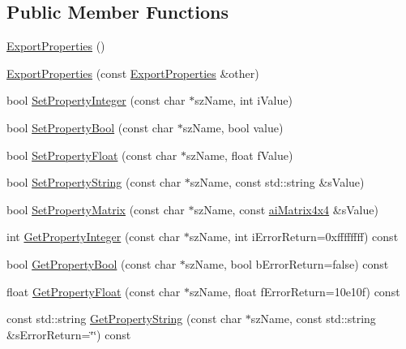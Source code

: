 \subsection*{Public Member Functions}
\begin{DoxyCompactItemize}
\item 
\hyperlink{class_assimp_1_1_export_properties_aedefab9bf14c50bcd319eda39030aa0e}{Export\-Properties} ()
\item 
\hyperlink{class_assimp_1_1_export_properties_a5c91357f3ca4dcf7f7582abdb551534d}{Export\-Properties} (const \hyperlink{class_assimp_1_1_export_properties}{Export\-Properties} \&other)
\item 
bool \hyperlink{class_assimp_1_1_export_properties_a3b5953dfef79567d672c81a58b51090c}{Set\-Property\-Integer} (const char $\ast$sz\-Name, int i\-Value)
\item 
bool \hyperlink{class_assimp_1_1_export_properties_a3eb3aea4da6b94da06b7dd118c864c38}{Set\-Property\-Bool} (const char $\ast$sz\-Name, bool value)
\item 
bool \hyperlink{class_assimp_1_1_export_properties_a574ace8f64fcf774f476b1a2e09cc9d6}{Set\-Property\-Float} (const char $\ast$sz\-Name, float f\-Value)
\item 
bool \hyperlink{class_assimp_1_1_export_properties_a2be9953a8f29595fc518e7ddb2fc481b}{Set\-Property\-String} (const char $\ast$sz\-Name, const std\-::string \&s\-Value)
\item 
bool \hyperlink{class_assimp_1_1_export_properties_ac77448b65347c90a6baa65ac4e546dbe}{Set\-Property\-Matrix} (const char $\ast$sz\-Name, const \hyperlink{structai_matrix4x4}{ai\-Matrix4x4} \&s\-Value)
\item 
int \hyperlink{class_assimp_1_1_export_properties_ac232d47a6da83ea03559fd0fb13e209a}{Get\-Property\-Integer} (const char $\ast$sz\-Name, int i\-Error\-Return=0xffffffff) const 
\item 
bool \hyperlink{class_assimp_1_1_export_properties_a135de6aaac3b29156331a833e06beb40}{Get\-Property\-Bool} (const char $\ast$sz\-Name, bool b\-Error\-Return=false) const 
\item 
float \hyperlink{class_assimp_1_1_export_properties_a2899c600cfd467995ff69ecf861b760f}{Get\-Property\-Float} (const char $\ast$sz\-Name, float f\-Error\-Return=10e10f) const 
\item 
const std\-::string \hyperlink{class_assimp_1_1_export_properties_abc17ede155cc4b155cce573d346b1913}{Get\-Property\-String} (const char $\ast$sz\-Name, const std\-::string \&s\-Error\-Return=\char`\"{}\char`\"{}) const 

\end{DoxyCompactItemize}
